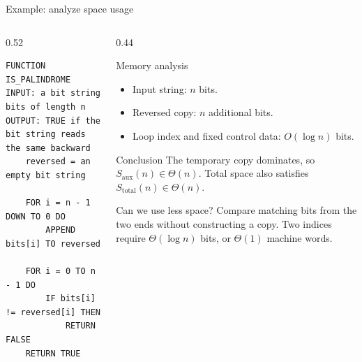 \documentclass[aspectratio=169]{beamer}
\begin{document}
\begin{frame}[fragile]{Example: analyze space usage}
  \scriptsize
  \begin{columns}[T]
    \begin{column}{0.52\textwidth}
\begin{lstlisting}[style=pseudo,basicstyle=\ttfamily]
FUNCTION IS_PALINDROME
INPUT: a bit string bits of length n
OUTPUT: TRUE if the bit string reads the same backward
    reversed = an empty bit string

    FOR i = n - 1 DOWN TO 0 DO
        APPEND bits[i] TO reversed

    FOR i = 0 TO n - 1 DO
        IF bits[i] != reversed[i] THEN
            RETURN FALSE
    RETURN TRUE
\end{lstlisting}
    \end{column}
    \begin{column}{0.44\textwidth}
      \begin{block}{Memory analysis}
        \begin{itemize}
          \item Input string: $n$ bits.
          \item Reversed copy: $n$ additional bits.
          \item Loop index and fixed control data: $O(\log n)$ bits.
        \end{itemize}
      \end{block}
      \begin{exampleblock}{Conclusion}
        The temporary copy dominates, so
        $S_{\mathrm{aux}}(n)\in\Theta(n)$. Total space also satisfies
        $S_{\mathrm{total}}(n)\in\Theta(n)$.
      \end{exampleblock}
      \begin{alertblock}{Can we use less space?}
        Compare matching bits from the two ends without constructing a copy.
        Two indices require $\Theta(\log n)$ bits, or $\Theta(1)$ machine words.
      \end{alertblock}
    \end{column}
  \end{columns}
\end{frame}
\end{document}
